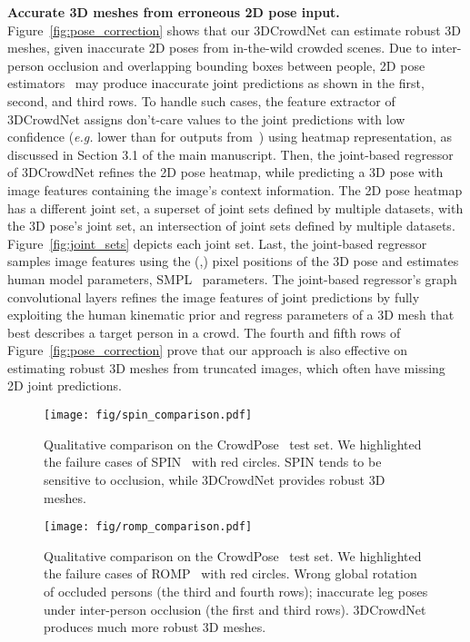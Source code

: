 \documentclass[10pt,twocolumn,letterpaper]{article}
\begin{document}
\noindent\textbf{Accurate 3D meshes from erroneous 2D pose input.}
Figure~\ref{fig:pose_correction} shows that our 3DCrowdNet can estimate robust 3D meshes, given inaccurate 2D poses from in-the-wild crowded scenes.
Due to inter-person occlusion and overlapping bounding boxes between people, 2D pose estimators~\cite{cao2017realtime,cheng2020higherhrnet} may produce inaccurate joint predictions as shown in the first, second, and third rows.
To handle such cases, the feature extractor of 3DCrowdNet assigns don't-care values to the joint predictions with low confidence (\textit{e.g.} lower than  for outputs from~\cite{cheng2020higherhrnet}) using heatmap representation, as discussed in Section 3.1 of the main manuscript.
Then, the joint-based regressor of 3DCrowdNet refines the 2D pose heatmap, while predicting a 3D pose with image features containing the image's context information.
The 2D pose heatmap has a different joint set, a superset of joint sets defined by multiple datasets, with the 3D pose's joint set, an intersection of joint sets defined by multiple datasets.
Figure~\ref{fig:joint_sets} depicts each joint set.
Last, the joint-based regressor samples image features using the (,) pixel positions of the 3D pose and estimates human model parameters, SMPL~\cite{loper2015smpl} parameters.
The joint-based regressor's graph convolutional layers refines the image features of joint predictions by fully exploiting the human kinematic prior and regress parameters of a 3D mesh that best describes a target person in a crowd.
The fourth and fifth rows of Figure~\ref{fig:pose_correction} prove that our approach is also effective on estimating robust 3D meshes from truncated images, which often have missing 2D joint predictions.

\begin{figure*}
\begin{center}
\texttt{[image: fig/spin\_comparison.pdf]}\end{center}
\vspace*{-3mm}
  \caption{
  Qualitative comparison on the CrowdPose~\cite{li2019crowdpose} test set.  We highlighted the failure cases of SPIN~\cite{kolotouros2019learning} with red circles. SPIN tends to be sensitive to occlusion, while 3DCrowdNet provides robust 3D meshes.
  }
\label{fig:spin_comparison}
\end{figure*}

\begin{figure*}
\begin{center}
\texttt{[image: fig/romp\_comparison.pdf]}
\end{center}
\vspace*{-5mm}
  \caption{
  Qualitative comparison on the CrowdPose~\cite{li2019crowdpose} test set. We highlighted the failure cases of ROMP~\cite{sun2021monocular} with red circles. Wrong global rotation of occluded persons (the third and fourth rows); inaccurate leg poses under inter-person occlusion (the first and third rows). 3DCrowdNet produces much more robust 3D meshes.
  }
\vspace*{-3mm}
\label{fig:romp_comparison}
\end{figure*}
\end{document}
